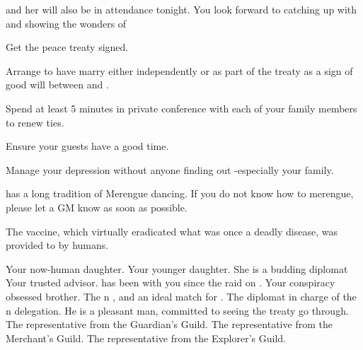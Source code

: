 \documentclass[char]{NeptuneBall}
\begin{document}
\cAriel{} and her \cWillow{\offspring} \cWillow{} will also be in attendance tonight. You look forward to catching up with \cAriel{} and showing \cWillow{} the wonders of \pAtlantis{}

\begin{itemz}[Goals]
  \item Get the peace treaty signed.
  \item Arrange to have \cPrincess{} marry \cPrince{} either independently or as part of the treaty as a sign of good will between \pAtlantis{} and \pPacifica{}.
  \item Spend at least 5 minutes in private conference with each of your family members to renew ties.
  \item Ensure your guests have a good time.
  \item Manage your depression without anyone finding out -especially your family.
\end{itemz}

\begin{itemz}[Notes]
  \item \pAtlantis{} has a long tradition of Merengue dancing. If you do not know how to merengue, please let a GM know as soon as possible.
  \item The \pPolio{} vaccine, which virtually eradicated what was once a deadly disease, was provided to \pAtlantis{} by humans.
\end{itemz}

\begin{contacts}
  \contact{\cAriel{}} Your now-human daughter.
  \contact{\cPrincess{}} Your younger daughter. She is a budding diplomat
  \contact{\cManta{}} Your trusted advisor. \cManta{\They{}} has been with you since the raid on \pPacifica{}.
  \contact{\cPlant{}} Your conspiracy obsessed brother.
  \contact{\cPrince{}} The \pPacifica{}n \cPrince{\prince}, and an ideal match for \cPrincess{}.
  \contact{\cDiplomat{}} The diplomat in charge of the \pPacifica{}n delegation. He is a pleasant man, committed to seeing the treaty go through.
  \contact{\cGeneral{}} The representative from the Guardian's Guild.
  \contact{\cSlave{}} The representative from the Merchant's Guild.
  \contact{\cPriest{}} The representative from the Explorer's Guild.
\end{contacts}
\end{document}
